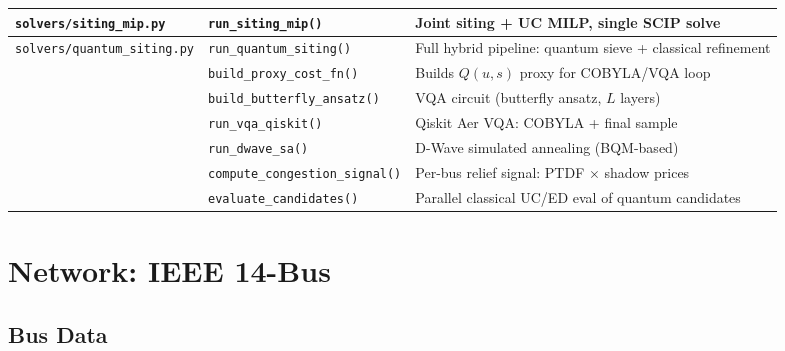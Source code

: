 \documentclass[11pt]{article}
\begin{document}
{\begin{tabular}{lll}
\texttt{solvers/siting\_mip.py} & \texttt{run\_siting\_mip()} & Joint siting + UC MILP, single SCIP solve \\
\midrule
\texttt{solvers/quantum\_siting.py} & \texttt{run\_quantum\_siting()} & Full hybrid pipeline: quantum sieve + classical refinement \\
                           & \texttt{build\_proxy\_cost\_fn()} & Builds $Q(u,s)$ proxy for COBYLA/VQA loop \\
                           & \texttt{build\_butterfly\_ansatz()} & VQA circuit (butterfly ansatz, $L$ layers) \\
                           & \texttt{run\_vqa\_qiskit()}  & Qiskit Aer VQA: COBYLA + final sample \\
                           & \texttt{run\_dwave\_sa()}    & D-Wave simulated annealing (BQM-based) \\
                           & \texttt{compute\_congestion\_signal()} & Per-bus relief signal: PTDF $\times$ shadow prices \\
                           & \texttt{evaluate\_candidates()} & Parallel classical UC/ED eval of quantum candidates \\
\bottomrule
\end{tabular}%
}

\section{Network: IEEE 14-Bus}

\subsection{Bus Data}
\end{document}
